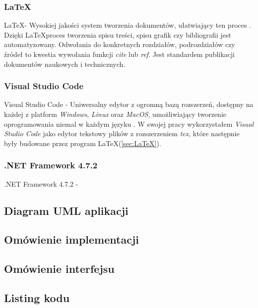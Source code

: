 \documentclass{article}
\begin{document}
        \subsubsection{\LaTeX}
        {
            \label{sec:LaTeX}
            \Large
            \justifying
            \LaTeX - Wysokiej jakości system tworzenia dokumentów, ułatwiający ten proces \cite{LaTeX}.
            Dzięki \LaTeX proces tworzenia spisu treści, spisu grafik czy bibliografii jest automatyzowany.
            Odwołania do konkretnych rozdziałów, podrozdziałów czy źródeł to kwestia wywołania funkcji \emph{cite} lub \emph{ref}.
            Jest standardem publikacji dokumentów naukowych i technicznych.
        }
        \subsubsection{Visual Studio Code}
        {
            \label{sec:VisualStudioCode}
            \Large
            \justifying
            \quad
            Visual Studio Code - Uniwersalny edytor z ogromną bazą rozszerzeń, dostępny na każdej z platform \emph{Windows}, \emph{Linux} oraz \emph{MacOS}, umożliwiający tworzenie oprogramowania niemal w każdym języku \cite{VSCode}.
            W swojej pracy wykorzystałem \emph{Visual Studio Code} jako edytor tekstowy plików z rozszerzeniem \emph{tex}, które następnie były budowane przez program \LaTeX (\ref{sec:LaTeX}).
        }
        \subsubsection{.NET Framework 4.7.2}
        {
            \label{sec:.NETFramework 4.7.2}
            \Large
            \justifying
            \quad
            .NET Framework 4.7.2 - 
        }

        \subsection{Diagram UML aplikacji}
        \subsection{Omówienie implementacji}
        \subsection{Omówienie interfejsu}
        \subsection{Listing kodu}
    \newpage
\end{document}
